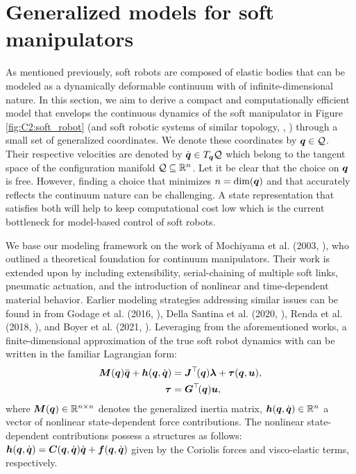 \section{Generalized models for soft manipulators}
\label{sec: chap2 section header}
As mentioned previously, soft robots are composed of elastic bodies that can be  modeled as a dynamically deformable continuum with of infinite-dimensional nature. In this section, we aim to derive a compact and computationally efficient model that envelops the continuous dynamics of  the soft manipulator in Figure \ref{fig:C2:soft_robot} (and soft robotic systems of similar topology, \eg, \cite{Katzschmann2018,Falkenhahn2015,BibEntryOrm2019Sep}) through a  small set of generalized coordinates. We denote these coordinates by ${\boldsymbol{q}}\in\mathcal{Q}$. Their respective velocities are denoted by ${\dot{\boldsymbol{q}}}\in T_{{\boldsymbol{q}}}\mathcal{Q}$ which belong to the tangent space of the configuration manifold $\mathcal{Q} \subseteq \mathbb{R}^n$.  Let it be clear that the choice on ${\boldsymbol{q}}$ is free. However, finding a choice that minimizes $n = \text{dim}({\boldsymbol{q}})$ and that accurately reflects the continuum nature can be challenging. A state representation that satisfies both will help to keep computational cost low which is the current bottleneck for model-based control of soft robots. 

We base our modeling framework on the work of Mochiyama et al. (2003, \cite{Mochiyama2003}), who outlined a theoretical foundation for continuum manipulators. Their work is extended upon by including extensibility, serial-chaining of multiple soft links, pneumatic actuation, and the introduction of nonlinear and time-dependent material behavior. Earlier modeling strategies addressing similar issues can be found in from Godage et al. (2016, \cite{Godage2015,Godage2016}), Della Santina et al. (2020, \cite{DellaSantina2020,DellaSantina2020a,DellaSantina2021}), Renda et al.
(2018, \cite{Renda2018}), and Boyer et al. (2021, \cite{Boyer2021}). Leveraging from the aforementioned works, a  finite-dimensional approximation of the true soft robot dynamics with  can be written in the familiar Lagrangian form:
%
\begin{align}
{\boldsymbol{M}}({\boldsymbol{q}}) {\ddot{\boldsymbol{q}}} + \boldsymbol{h}({\boldsymbol{q}},{\dot{\boldsymbol{q}}}) & = \boldsymbol{J}^\top\!({\boldsymbol{q}}) \boldsymbol{\lambda} + \boldsymbol{\tau}({\boldsymbol{q}},\boldsymbol{u}), \label{eq:C2:model0}\\
\boldsymbol{\tau} & = \boldsymbol{G}^\top\!({\boldsymbol{q}}) \boldsymbol{u},
\label{eq:C2:input_model0}
\end{align}
%
where ${\boldsymbol{M}}({\boldsymbol{q}}) \in \mathbb{R}^{n\times n}$ denotes the generalized inertia matrix, $\boldsymbol{h}({\boldsymbol{q}},{\dot{\boldsymbol{q}}}) \in \mathbb{R}^n$ a vector of nonlinear state-dependent force contributions. The nonlinear state-dependent contributions possess a structures as follows: $\boldsymbol{h}({\boldsymbol{q}},{\dot{\boldsymbol{q}}}) = \boldsymbol{C}({\boldsymbol{q}},{\dot{\boldsymbol{q}}}){\dot{\boldsymbol{q}}} + \boldsymbol{f}({\boldsymbol{q}},{\dot{\boldsymbol{q}}})$  given by the Coriolis forces and visco-elastic terms, respectively.

